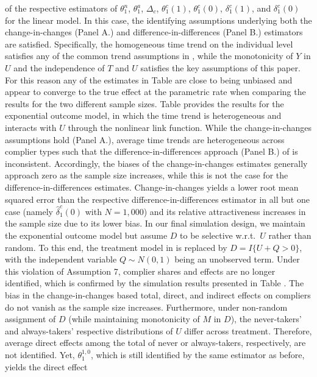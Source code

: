 \documentclass[a4paper,12pt]{article}
\begin{document}
 \doublespacing \pagestyle{plain}
of the respective estimators of $\theta_1^n$, $\theta_1^a$, $\Delta_c$,  $\theta_1^c(1)$, $\theta_1^c(0)$, $\delta_1^c(1)$, and $\delta_1^c(0)$ for the linear model. In this case, the identifying assumptions underlying both the change-in-changes (Panel A.) and difference-in-differences (Panel B.) estimators are satisfied. Specifically, the homogeneous time trend on the individual level satisfies any of the common trend assumptions in , while the monotonicity of $Y$ in $U$ and the independence of $T$ and $U$ satisfies the key assumptions of this paper. For this reason any of the estimates in Table  are close to being unbiased and appear to converge to the true effect at the parametric rate when comparing the results for the two different sample sizes.
Table  provides the results for the exponential outcome model, in which the time trend is heterogeneous and interacts with $U$ through the nonlinear link function. While the change-in-changes assumptions hold (Panel A.), average time trends are heterogeneous across complier types such that the difference-in-differences approach (Panel B.) of  is inconsistent. Accordingly, the biases of the change-in-changes estimates generally approach zero as the sample size increases, while this is not the case for the difference-in-differences estimates. Change-in-changes yields a lower root mean squared error than the respective difference-in-differences estimator in all but one case (namely $\hat{\delta}_1^c(0)$ with $N=1,000$) and its relative attractiveness increases in the sample size due to its lower bias.
In our final simulation design, we maintain the exponential outcome model but assume $D$ to be selective w.r.t.\ $U$ rather than random. To this end, the treatment model in is replaced by $D=I\{U+Q>0\}$, with the independent variable $Q\sim N(0,1)$ being an unobserved term. Under this violation of Assumption 7, complier shares and effects are no longer identified, which is confirmed by the simulation results presented in Table . The bias in the change-in-changes based total, direct, and indirect effects on compliers do not vanish as the sample size increases. Furthermore, under non-random assignment of $D$ (while maintaining monotonicity of $M$ in $D$), the never-takers' and always-takers' respective distributions of $U$ differ across treatment. Therefore, average direct effects among the total of never or always-takers, respectively, are not identified. Yet, $\theta_1^{1,0}$, which is still identified by the same estimator as before, yields the direct effect
\end{document}
